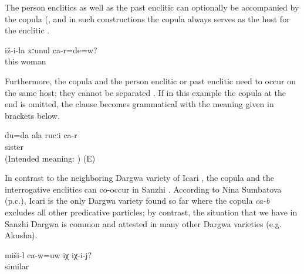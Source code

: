 The person enclitics as well as the past enclitic can optionally be accompanied by the copula (, and in such constructions the copula always serves as the host for the enclitic . 

%
\begin{exe}
	\ex	\label{ex:‎‎‎Are you his wife}
	\gll	iž-i-la	xːunul	ca-r=de=w?\\
		this	woman	\\
	\glt	{}
\end{exe}

Furthermore, the copula and the person enclitic or past enclitic need to occur on the same host; they cannot be separated . If in this example the copula at the end is omitted, the clause becomes grammatical with the meaning given in brackets below. 
%
\begin{exe}
	\ex	\label{ex:It is me who is your sister.}
	\gll	*du=da	ala	rucːi	ca-r\\
				sister	\\
	\glt	(Intended meaning: ) (E)
\end{exe}

In contrast to the neighboring Dargwa variety of Icari \citep[138]{Sumbatova.Mutalov2003}, the copula and the interrogative enclitics can co-occur in Sanzhi . According to Nina Sumbatova (p.c.), Icari is the only Dargwa variety found so far where the copula \textit{ca-b} excludes all other predicative particles; by contrast, the situation that we have in Sanzhi Dargwa is common and attested in many other Dargwa varieties (e.g. Akusha). 

\begin{exe}
	\ex	\label{ex:Is this similar to him}
	\gll	miši-l	ca-w=uw	iχ	iχ-i-j?\\
		similar		\tsc{dem.down}	\\
	\glt	{}
\end{exe}

